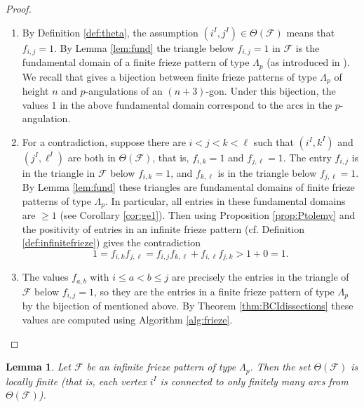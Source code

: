 \documentclass[11pt,a4paper]{amsart}
\newtheorem{Lemma}{Lemma}[section]
\theoremstyle{definition}
\numberwithin{equation}{section}
\begin{document}
\begin{proof}
\begin{enumerate}
\item[{(a)}] By Definition \ref{def:theta}, the assumption $(i^I,j^I)\in \Theta(\mathcal{F})$ means that
$f_{i,j}=1$. By Lemma \ref{lem:fund} the triangle below $f_{i,j}=1$ in $\mathcal{F}$ is the fundamental
domain of a finite frieze pattern of type $\Lambda_p$ (as introduced in \cite{HJ17}). We recall that
\cite[Theorem A]{HJ17} gives a bijection between finite frieze patterns of type $\Lambda_p$ of height $n$
and $p$-angulations of an $(n+3)$-gon. Under this bijection, the values 1 in the above fundamental domain 
correspond to the arcs in the $p$-angulation. 
\item[{(b)}] For a contradiction, suppose there are $i<j<k<\ell$ such that $(i^I,k^I)$ and $(j^I,\ell^I)$ are both in
$\Theta(\mathcal{F})$, that is, $f_{i,k}=1$ and $f_{j,\ell}=1$. The entry $f_{i,j}$ is in the triangle 
in $\mathcal{F}$ below $f_{i,k}=1$, and $f_{k,\ell}$ is in the triangle below $f_{j,\ell}=1$. By Lemma 
\ref{lem:fund} these triangles are fundamental domains of finite frieze patterns of type $\Lambda_p$.
In particular, all entries in these fundamental domains are $\ge 1$ (see Corollary \ref{cor:ge1}). 
Then using Proposition \ref{prop:Ptolemy} and the positivity of entries in an infinite 
frieze pattern (cf. Definition \ref{def:infinitefrieze}) gives the contradiction
$$1= f_{i,k}f_{j,\ell} = f_{i,j} f_{k,\ell} + f_{i,\ell}f_{j,k} > 1+0 = 1.
$$
\item[{(c)}] The values $f_{a,b}$ with $i\le a<b\le j$ are precisely the entries in the triangle of $\mathcal{F}$ below 
$f_{i,j}=1$, so they are the entries in a finite frieze pattern of type $\Lambda_p$ by the bijection
of \cite[Theorem A]{HJ17} mentioned above. By Theorem \ref{thm:BCIdissections} these values are 
computed using Algorithm \ref{alg:frieze}. 
\end{enumerate}
\end{proof}


\begin{Lemma} \label{lem:locallyfinite}
Let $\mathcal{F}$ be an infinite frieze pattern of type $\Lambda_p$. Then the set $\Theta(\mathcal{F})$
is locally finite (that is, each vertex $i^I$ is connected to only finitely many arcs from $\Theta(\mathcal{F})$). 
\end{Lemma}
\end{document}
